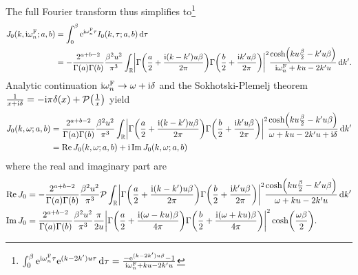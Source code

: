 \documentclass[english, parskip=full]{scrartcl}
\begin{document}
The full Fourier transform thus simplifies to\footnote{$\int_{0}^{\beta} \text{e}^{\text{i}\omega_n^{\text{F}} \tau} \text{e}^{(k-2k')u\tau} \,\mathrm{d}\tau = \frac{-\text{e}^{(k-2k')u\beta} - 1}{\text{i}\omega_n^{\text{F}} + ku - 2k'u}$}
\begin{align}
J_0(k,\i\omega_n^\F;a,b) &= \intx{0}{\beta}{\powe{\i\omega_n^\F\tau} I_0(k,\tau;a,b)}{\tau}\\
&= -\frac{2^{a+b-2}}{\Gamma(a)\Gamma(b)} \frac{\beta^2u^2}{\pi^3} \intr{\abs*{\Gamma\kla*{\frac{a}{2} + \frac{\i (k-k')u\beta}{2\pi}} \Gamma\kla*{\frac{b}{2} + \frac{\i k'u\beta}{2\pi}}}^2 \frac{\cosh\kla*{ku\frac{\beta}{2} - k'u\beta}}{\i\omega_n^\F + ku - 2k'u} }{k'}.
\end{align}
Analytic continuation $\text{i}\omega_n^{\text{F}}\rightarrow \omega + \text{i}\delta$ and the Sokhotski-Plemelj theorem $\frac{1}{x + \i\delta} = -\i\pi\delta(x) + \mathcal{P}\kla*{\frac{1}{x}}$ yield
\begin{align}
J_0(k,\omega;a,b) &= \frac{2^{a+b-2}}{\Gamma(a)\Gamma(b)} \frac{\beta^2u^2}{\pi^3} \intr{\abs*{\Gamma\kla*{\frac{a}{2} + \frac{\i (k-k')u\beta}{2\pi}} \Gamma\kla*{\frac{b}{2} + \frac{\i k'u\beta}{2\pi}}}^2 \frac{\cosh\kla*{ku\frac{\beta}{2} - k'u\beta}}{\omega + ku - 2k'u + \i\delta} }{k'}\\
&= \Re J_0(k,\omega;a,b) + \i \Im J_0(k,\omega;a,b)
\end{align}
where the real and imaginary part are
\begin{align}
\Re J_0 &= -\frac{2^{a+b-2}}{\Gamma(a)\Gamma(b)} \frac{\beta^2u^2}{\pi^3} \mathcal{P} \intr{\abs*{\Gamma\kla*{\frac{a}{2} + \frac{\i (k-k')u\beta}{2\pi}} \Gamma\kla*{\frac{b}{2} + \frac{\i k'u\beta}{2\pi}}}^2 \frac{\cosh\kla*{ku\frac{\beta}{2} - k'u\beta}}{\omega + ku - 2k'u} }{k'} \\
\Im J_0 &= \frac{2^{a+b-2}}{\Gamma(a)\Gamma(b)} \frac{\beta^2u^2}{\pi^3} \frac{\pi}{2u} \abs*{\Gamma\kla*{\frac{a}{2} + \frac{\i (\omega - ku)\beta}{4\pi}} \Gamma\kla*{\frac{b}{2} + \frac{\i (\omega + ku)\beta}{4\pi}}}^2 \cosh\kla*{\frac{\omega\beta}{2}}.
\end{align}
\end{document}
